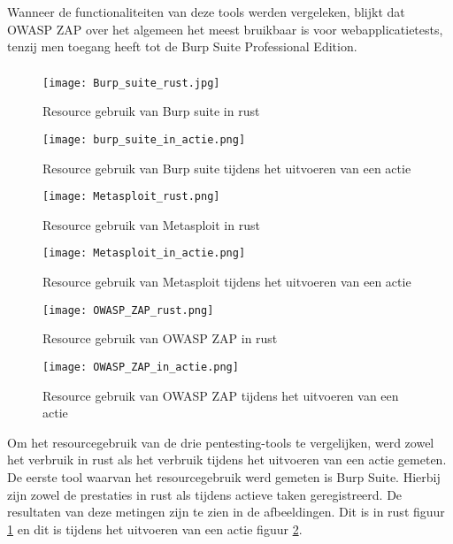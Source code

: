 Wanneer de functionaliteiten van deze tools werden vergeleken, blijkt dat OWASP ZAP over het algemeen het meest bruikbaar is voor 
webapplicatietests, tenzij men toegang heeft tot de Burp Suite Professional Edition.
\subsubsection{}
\begin{figure}
    \centering
    \texttt{[image: Burp\_suite\_rust.jpg]}
    \caption[Resource gebruik van Burp suite in rust]{Resource gebruik van Burp suite in rust}
    \label{fig:burp_suite_rust}
\end{figure}
\begin{figure}
    \centering
    \texttt{[image: burp\_suite\_in\_actie.png]}
    \caption[Resource gebruik van Burp suite tijdens het uitvoeren van een actie]{Resource gebruik van Burp suite tijdens het uitvoeren van een actie}
    \label{fig:burp_suite_actie}
\end{figure}
\begin{figure}
    \centering
    \texttt{[image: Metasploit\_rust.png]}
    \caption[Resource gebruik van Metasploit in rust]{Resource gebruik van Metasploit in rust}
    \label{fig:metasploit_rust}
\end{figure}
\begin{figure}
    \centering
    \texttt{[image: Metasploit\_in\_actie.png]}
    \caption[Resource gebruik van Metasploit tijdens het uitvoeren van een actie]{Resource gebruik van Metasploit tijdens het uitvoeren van een actie}
    \label{fig:metasploit_actie}
\end{figure}
\begin{figure}
    \centering
    \texttt{[image: OWASP\_ZAP\_rust.png]}
    \caption[Resource gebruik van OWASP ZAP in rust]{Resource gebruik van OWASP ZAP in rust}
    \label{fig:owasp_rust}
\end{figure}
\begin{figure}
    \centering
    \texttt{[image: OWASP\_ZAP\_in\_actie.png]}
    \caption[Resource gebruik van OWASP ZAP tijdens het uitvoeren van een actie]{Resource gebruik van OWASP ZAP tijdens het uitvoeren van een actie}
    \label{fig:owasp_actie}
\end{figure}
Om het resourcegebruik van de drie pentesting-tools te vergelijken, werd zowel het verbruik in rust als het verbruik tijdens het 
uitvoeren van een actie gemeten. De eerste tool waarvan het resourcegebruik werd gemeten is Burp Suite. Hierbij zijn zowel de 
prestaties in rust als tijdens actieve taken geregistreerd. De resultaten van deze metingen zijn te zien in de afbeeldingen. 
Dit is in rust figuur \ref{fig:burp_suite_rust} en dit is tijdens het uitvoeren van een actie figuur \ref{fig:burp_suite_actie}. 

